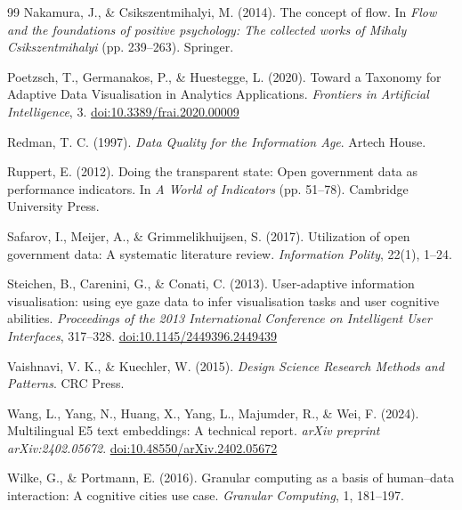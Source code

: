 \documentclass[12pt,a4paper]{article}
\providecommand{\doi}[1]{\href{https://doi.org/#1}{doi:#1}}
\begin{document}
\begin{thebibliography}{99}
Nakamura, J., \& Csikszentmihalyi, M. (2014).
\newblock The concept of flow.
\newblock In \textit{Flow and the foundations of positive psychology: The collected works of Mihaly Csikszentmihalyi} (pp. 239--263).
\newblock Springer.

 Poetzsch, T., Germanakos, P., \& Huestegge, L. (2020).
 \newblock Toward a Taxonomy for Adaptive Data Visualisation in Analytics Applications.
 \newblock \textit{Frontiers in Artificial Intelligence}, 3.
 \newblock \doi{10.3389/frai.2020.00009}

Redman, T. C. (1997).
\newblock \textit{Data Quality for the Information Age}.
\newblock Artech House.

Ruppert, E. (2012).
\newblock Doing the transparent state: Open government data as performance indicators.
\newblock In \textit{A World of Indicators} (pp. 51--78). Cambridge University Press.

Safarov, I., Meijer, A., \& Grimmelikhuijsen, S. (2017).
\newblock Utilization of open government data: A systematic literature review.
\newblock \textit{Information Polity}, 22(1), 1--24.

 Steichen, B., Carenini, G., \& Conati, C. (2013).
 \newblock User-adaptive information visualisation: using eye gaze data to infer visualisation tasks and user cognitive abilities.
 \newblock \textit{Proceedings of the 2013 International Conference on Intelligent User Interfaces}, 317--328.
 \newblock \doi{10.1145/2449396.2449439}

Vaishnavi, V. K., \& Kuechler, W. (2015).
\newblock \textit{Design Science Research Methods and Patterns}.
\newblock CRC Press.

Wang, L., Yang, N., Huang, X., Yang, L., Majumder, R., \& Wei, F. (2024).
\newblock Multilingual E5 text embeddings: A technical report.
\newblock \textit{arXiv preprint arXiv:2402.05672}.
\newblock \doi{10.48550/arXiv.2402.05672}

Wilke, G., \& Portmann, E. (2016).
\newblock Granular computing as a basis of human--data interaction: A cognitive cities use case.
\newblock \textit{Granular Computing}, 1, 181--197.





\end{thebibliography}
\end{document}
